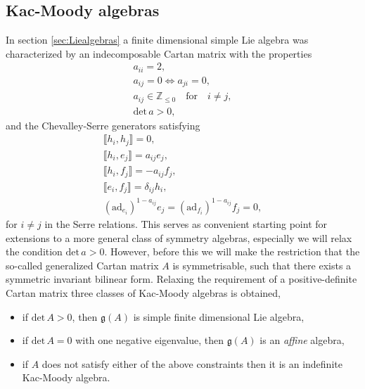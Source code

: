 \subsection{Kac-Moody algebras}\label{sec:KacMoody}
In section \ref{sec:Liealgebras} a finite dimensional simple Lie algebra was characterized by an indecomposable Cartan matrix with the properties 
\begin{equation}
    \begin{aligned}
        a_{ii} = 2,\\
        a_{ij} = 0 \Longleftrightarrow a_{ji} = 0,\\
        a_{ij}\in \mathbb{Z}_{\leq 0} \quad\text{for}\quad i\neq j,\\
        \text{det}\,a >0,
    \end{aligned}
\end{equation}
and the Chevalley-Serre generators satisfying 
\begin{equation}
\begin{aligned}\label{eq:ChevalleySerre2}
    \llbracket h_i,h_j\rrbracket = 0,\\
    \llbracket h_i,e_j\rrbracket = a_{ij}e_{j},\\
    \llbracket h_i,f_j\rrbracket = -a_{ij}f_{j},\\
    \llbracket e_i,f_j\rrbracket = \delta_{ij}h_i,\\
    (\text{ad}_{e_i})^{1-a_{ij}}e_j = (\text{ad}_{f_i})^{1-a_{ij}}f_j = 0,
\end{aligned}
\end{equation}
for $i\neq j$ in the Serre relations. This serves as convenient starting point for extensions to a more general class of symmetry algebras, especially we will relax the condition $\text{det}\,a>0$. However, before this we will make the restriction that the so-called generalized Cartan matrix $A$ is symmetrisable, such that there exists a symmetric invariant bilinear form. Relaxing the requirement of a positive-definite Cartan matrix three classes of Kac-Moody algebras is obtained,
\begin{itemize}
    \item if $\text{det}\,A >0$, then $\mathfrak{g}(A)$ is simple finite dimensional Lie algebra,
    \item if $\text{det}\,A =0$ with one negative eigenvalue, then $\mathfrak{g}(A)$ is an \emph{affine} algebra,  
    \item if $A$ does not satisfy either of the above constraints then it is an indefinite Kac-Moody algebra.
\end{itemize}

